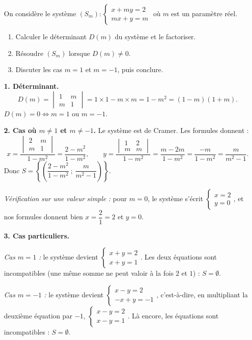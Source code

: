 \documentclass[11pt]{article}
\begin{document}
\begin{exoresolu}
On considère le système $(S_m) : \begin{cases} x + my = 2 \\ mx + y = m \end{cases}$ où $m$ est un paramètre réel.
\begin{enumerate}
\item Calculer le déterminant $D(m)$ du système et le factoriser.
\item Résoudre $(S_m)$ lorsque $D(m) \neq 0$.
\item Discuter les cas $m = 1$ et $m = -1$, puis conclure.
\end{enumerate}
\tcblower
\textbf{1. Déterminant.}
\[
D(m) = \begin{vmatrix} 1 & m \\ m & 1 \end{vmatrix} = 1\times 1 - m\times m = 1 - m^2 = (1 - m)(1 + m).
\]
$D(m) = 0 \iff m = 1$ ou $m = -1$.

\textbf{2. Cas où $m \neq 1$ et $m \neq -1$.} Le système est de Cramer. Les formules donnent :
\[
x = \frac{\begin{vmatrix} 2 & m \\ m & 1 \end{vmatrix}}{1 - m^2} = \frac{2 - m^2}{1 - m^2}, \qquad
y = \frac{\begin{vmatrix} 1 & 2 \\ m & m \end{vmatrix}}{1 - m^2} = \frac{m - 2m}{1 - m^2} = \frac{-m}{1 - m^2} = \frac{m}{m^2 - 1}.
\]
Donc $S = \left\{ \left( \dfrac{2 - m^2}{1 - m^2}\ ;\ \dfrac{m}{m^2 - 1} \right) \right\}$.

\emph{Vérification sur une valeur simple :} pour $m = 0$, le système s'écrit $\begin{cases} x = 2 \\ y = 0 \end{cases}$, et nos formules donnent bien $x = \dfrac{2}{1} = 2$ et $y = 0$.

\textbf{3. Cas particuliers.}

\emph{Cas $m = 1$ :} le système devient $\begin{cases} x + y = 2 \\ x + y = 1 \end{cases}$. Les deux équations sont incompatibles (une même somme ne peut valoir à la fois $2$ et $1$) : $S = \emptyset$.

\emph{Cas $m = -1$ :} le système devient $\begin{cases} x - y = 2 \\ -x + y = -1 \end{cases}$, c'est-à-dire, en multipliant la deuxième équation par $-1$, $\begin{cases} x - y = 2 \\ x - y = 1 \end{cases}$. Là encore, les équations sont incompatibles : $S = \emptyset$.


\end{exoresolu}
\end{document}
